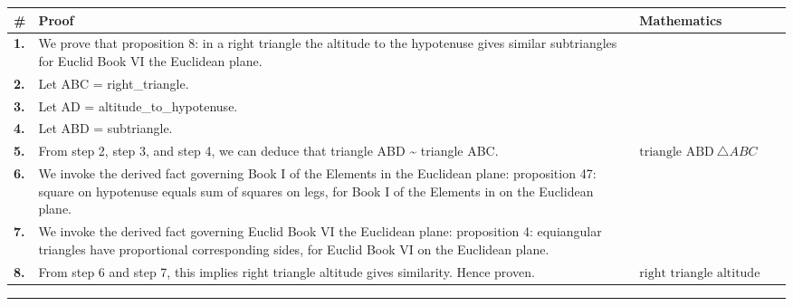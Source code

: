 \documentclass[11pt]{article}
\theoremstyle{definition}
\begin{document}
\begin{tabular}{@{} >{\raggedright\arraybackslash}p{} >{\raggedright\arraybackslash}p{} >{\raggedleft\arraybackslash}p{} @{}}
\textbf{\#} & \textbf{Proof} & \textbf{Mathematics} \\
\midrule
\textbf{1.} & We prove that proposition 8: in a right triangle the altitude to the hypotenuse gives similar subtriangles for Euclid Book VI the Euclidean plane. & \\[0.45em]
\textbf{2.} & Let ABC = right\_triangle. & \\[0.45em]
\textbf{3.} & Let AD = altitude\_to\_hypotenuse. & \\[0.45em]
\textbf{4.} & Let ABD = subtriangle. & \\[0.45em]
\textbf{5.} & From step 2, step 3, and step 4, we can deduce that triangle ABD \textasciitilde{} triangle ABC. & $\displaystyle \text{triangle ABD} ~ \triangle ABC$ \\[0.45em]
\textbf{6.} & We invoke the derived fact governing Book I of the Elements in the Euclidean plane: proposition 47: square on hypotenuse equals sum of squares on legs, for Book I of the Elements in on the Euclidean plane. & \\[0.45em]
\textbf{7.} & We invoke the derived fact governing Euclid Book VI the Euclidean plane: proposition 4: equiangular triangles have proportional corresponding sides, for Euclid Book VI on the Euclidean plane. & \\[0.45em]
\textbf{8.} & From step 6 and step 7, this implies right triangle altitude gives similarity. Hence proven. & $\displaystyle \text{right triangle altitude gives similarity}$ \\[0.45em]
\bottomrule
\end{tabular}
\label{thm:Geometry-Euclid Book VI-proposition_8_in_a_right_triangle_the_altitude_to_the_hypotenuse_gives_similar_subtriangles}
\par\medskip\hrule
\end{document}

